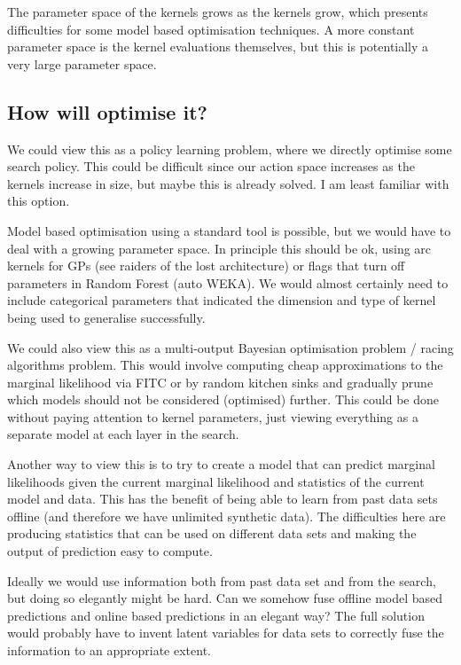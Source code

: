 \documentclass[twoside,11pt]{article}
\begin{document}
The parameter space of the kernels grows as the kernels grow, which presents difficulties for some model based optimisation techniques.
A more constant parameter space is the kernel evaluations themselves, but this is potentially a very large parameter space.

\subsection{How will optimise it?}

We could view this as a policy learning problem, where we directly optimise some search policy.
This could be difficult since our action space increases as the kernels increase in size, but maybe this is already solved.
I am least familiar with this option.

Model based optimisation using a standard tool is possible, but we would have to deal with a growing parameter space.
In principle this should be ok, using arc kernels for GPs (see raiders of the lost architecture) or flags that turn off parameters in Random Forest (\eg auto WEKA).
We would almost certainly need to include categorical parameters that indicated the dimension and type of kernel being used to generalise successfully.

We could also view this as a multi-output Bayesian optimisation problem / racing algorithms problem.
This would involve computing cheap approximations to the marginal likelihood \eg via FITC or by random kitchen sinks and gradually prune which models should not be considered (optimised) further.
This could be done without paying attention to kernel parameters, just viewing everything as a separate model at each layer in the search.

Another way to view this is to try to create a model that can predict marginal likelihoods given the current marginal likelihood and statistics of the current model and data.
This has the benefit of being able to learn from past data sets offline (and therefore we have unlimited synthetic data).
The difficulties here are producing statistics that can be used on different data sets and making the output of prediction easy to compute.

Ideally we would use information both from past data set and from the search, but doing so elegantly might be hard.
Can we somehow fuse offline model based predictions and online based predictions in an elegant way?
The full solution would probably have to invent latent variables for data sets to correctly fuse the information to an appropriate extent.
\end{document}
